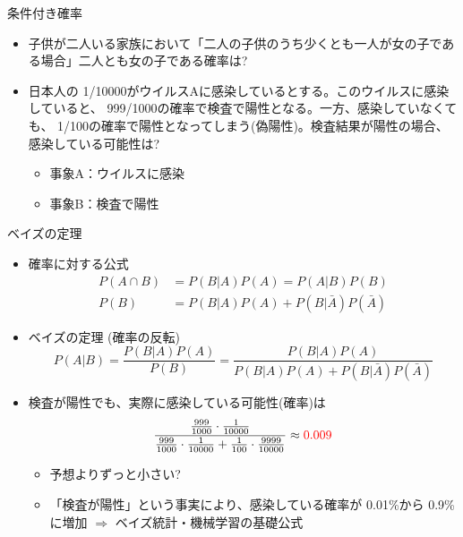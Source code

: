 \documentclass[dvipdfmx]{beamer}
\begin{document}
\begin{frame}[t,fragile]{条件付き確率}
  \begin{itemize}
    \setlength{\itemsep}{1em}
  \item 子供が二人いる家族において「二人の子供のうち少くとも一人が女の子である場合」二人とも女の子である確率は?
  \item 日本人の{\color{red} 1/10000}がウイルスAに感染しているとする。このウイルスに感染していると、{\color{red} 999/1000}の確率で検査で陽性となる。一方、感染していなくても、{\color{red} 1/100}の確率で陽性となってしまう(偽陽性)。検査結果が陽性の場合、感染している可能性は?
    \begin{itemize}
    \item 事象A：ウイルスに感染
    \item 事象B：検査で陽性
    \end{itemize}
  \end{itemize}
\end{frame}

\begin{frame}[t,fragile]{ベイズの定理}
  \begin{itemize}
  \item 確率に対する公式
    \begin{align*}
      P(A \cap B) &= P(B|A) P(A) = P(A|B) P(B) \\ P(B) &= P(B|A) P(A) + P(B|\bar{A}) P(\bar{A})
    \end{align*}
  \item ベイズの定理 (確率の反転)
    \[
    P(A|B) = \frac{P(B|A)P(A)}{P(B)} = \frac{P(B|A)P(A)}{P(B|A) P(A) + P(B|\bar{A}) P(\bar{A})}
    \]
  \item 検査が陽性でも、実際に感染している可能性(確率)は
    \[
    \frac{\frac{999}{1000} \cdot \frac{1}{10000}}{\frac{999}{1000} \cdot \frac{1}{10000} + \frac{1}{100} \cdot \frac{9999}{10000}} \approx {\color{red} 0.009}
    \]
    \begin{itemize}
    \item 予想よりずっと小さい?
    \item 「検査が陽性」という事実により、感染している確率が 0.01\%から 0.9\%に増加 $\Rightarrow$ ベイズ統計・機械学習の基礎公式
    \end{itemize}
  \end{itemize}
\end{frame}
\end{document}
